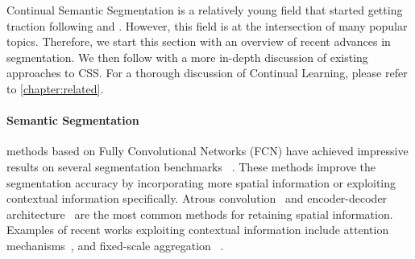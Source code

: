 Continual Semantic Segmentation is a relatively young field that started getting traction following
\cite{michieli2019ilt} and \cite{cermelli2020modelingthebackground}. However, this field is at the
intersection of many popular topics. Therefore, we start this section with an overview of recent
advances in segmentation. We then follow with a more in-depth discussion of existing approaches to
\ac{CSS}. For a thorough discussion of Continual Learning, please refer to
\autoref{chapter:related}.

\paragraph{Semantic Segmentation} methods based on Fully Convolutional Networks (FCN)
\citep{long2015fcn,sermanet2014overfeat} have achieved impressive results on several segmentation
benchmarks ~\citep{everingham2015pascalvoc,
    cordts2016cityscapes,zhou2017adedataset,caesar2018cocoostuff}. These methods improve the
segmentation accuracy by incorporating more spatial information or exploiting contextual information
specifically. Atrous convolution~\citep{chen2018deeplab,mehta2018espnet} and encoder-decoder
architecture~\citep{ronneberger2015UNet,noh2015deconvolution,badrinarayanan2017segnet} are the most
common methods for retaining spatial information. Examples of recent works exploiting contextual
information include attention
mechanisms~\citep{yuan2018ocnet,zhao2018psanet,fu2019DANet,huang2019CCNet,yuan2020ocr,tao2020HRNet,zhang2020resnest},
and fixed-scale aggregation
~\citep{zhao2017PSPNet,chen2018deeplab,chen2018ZPSA,zhang2018ContextEncoding}.

